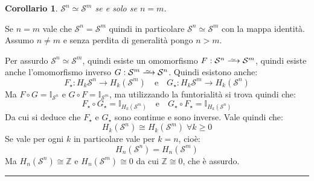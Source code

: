 \documentclass[10pt, twoside=false, x11names]{scrbook}
\newtheorem{corollary}[theorem]{Corollario}
\newenvironment{proof}{{\textbf{Dimostrazione}:}}{\hfill\rule{2mm}{2mm} \newline}
\newcommand{\Z}{\mathbb{Z}}
\newcommand{\Id}[1][]{\mathbb{I}_#1}
\newcommand{\Sph}[1][]{\mathcal{S}^#1}
\newcommand{\homoto}{\xrightarrow{\,\smash{\raisebox{-0.65ex}{\ensuremath{\scriptstyle\sim}}}\,}}
\begin{document}
\begin{corollary}
  $ \Sph{n} \simeq \Sph{m} $ se e solo se $ n = m $.
\end{corollary}
\begin{proof}
Se $ n = m $ vale che $ \Sph{n} = \Sph{m} $ quindi in particolare
$ \Sph{n} \simeq \Sph{m} $ con la mappa identità. Assumo $ n \not = m $
e senza perdita di generalità pongo $ n > m $.

Per assurdo $ \Sph{n} \simeq \Sph{m} $, quindi esiste un omomorfismo
$ F: \Sph{n} \homoto \Sph{m} $, quindi esiste anche l'omomorfismo
inverso $ G: \Sph{m} \homoto \Sph{n} $.
Quindi esistono anche:
\[
  F_\star: H_k{\Sph{n}} \to H_k(\Sph{m}) \quad \text{e} \quad G_\star: H_k{\Sph{m}} \to H_k(\Sph{n})
\]
Ma $ F \circ G = \Id{\Sph{n}} $ e $ G \circ F = \Id{\Sph{m}} $, ma utilizzando
la funtorialità si trova quindi che:
\[
  F_\star \circ G_\star = \Id{H_k(\Sph{m})} \quad \text{e} \quad G_\star \circ F_\star = \Id{H_k(\Sph{n})}
\]
Da cui si deduce che $ F_\star $ e $ G_\star $ sono continue e sono inverse.
Vale quindi che:
\[
  H_k(\Sph{n}) \cong H_k(\Sph{m}) \; \forall k \geq 0
\]
Se vale per ogni $ k $ in particolare vale per $ k = n $, cioè:
\[
  H_n(\Sph{n}) = H_n(\Sph{m})
\]
Ma $ H_n(\Sph{n}) \cong \Z $ e $ H_n(\Sph{m}) \cong 0 $ da cui $ \Z \cong 0 $, che è assurdo.
\end{proof}
\end{document}
